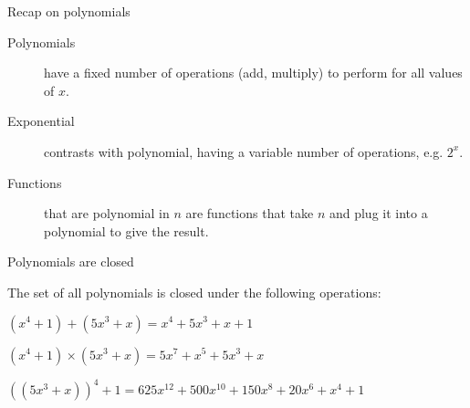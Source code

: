 \documentclass{beamer}
\begin{document}
\begin{frame}[fragile]{Recap on polynomials}
  
  
  \begin{description}
    \item[Polynomials] have a fixed number of operations (add, multiply) to perform for all values of \( x \).
    \item[Exponential] contrasts with polynomial, having a variable number of operations, e.g. \( 2^x \).
    \item[Functions] that are polynomial in $n$ are functions that take $n$ and plug it into a polynomial to give the result.
  \end{description}

  \begin{adjustbox}{max width={0.4\textwidth}, center}
  \end{adjustbox}

\end{frame}


\begin{frame}[fragile]{Polynomials are closed}
  
  
  The set of all polynomials is closed under the following operations:
  \begin{description}[Multiplication:]
    \setlength\itemsep{4mm}
    \item[Addition:] \( (x^4 + 1) + (5 x^3 + x) = x^4 + 5 x^3 + x + 1 \)
    \item[Multiplication:] \( (x^4 + 1) \times (5 x^3 + x) = 5 x^7 + x^5 + 5 x^3 + x \)
    \item[Composition:] \( ((5 x^3 + x))^4 + 1  = 625x^{12} + 500 x^{10} + 150x^8 + 20x^6 + x^4 +1 \)
  \end{description}


\end{frame}
\end{document}
